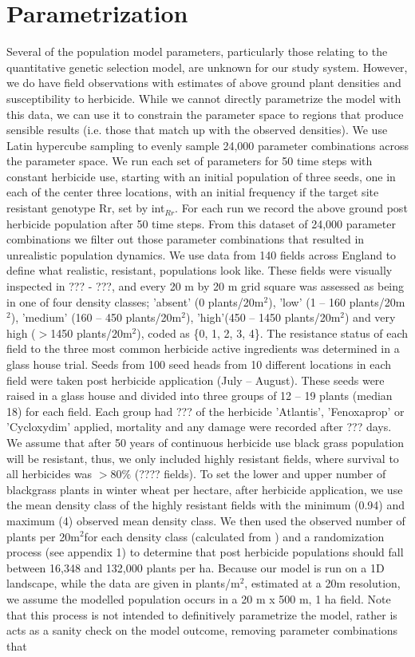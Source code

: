 \documentclass[12pt, a4paper]{article}
\begin{document}
\section{Parametrization}
Several of the population model parameters, particularly those relating to the quantitative genetic selection model, are unknown for our study system. However, we do have field observations with estimates of above ground plant densities and susceptibility to herbicide. While we cannot directly parametrize the model with this data, we can use it to constrain the parameter space to regions that produce sensible results (i.e. those that match up with the observed densities). We use Latin hypercube sampling to evenly sample 24,000 parameter combinations across the parameter space. We run each set of parameters for 50 time steps with constant herbicide use, starting with an initial population of three seeds, one in each of the center three locations, with an initial frequency if the target site resistant genotype Rr, set by int$_{Rr}$. For each run we record the above ground post herbicide population after 50 time steps. From this dataset of 24,000 parameter combinations we filter out those parameter combinations that resulted in unrealistic population dynamics. We use data from 140 fields across England to define what realistic, resistant, populations look like. These fields were visually inspected in ??? - ???, and every 20 m by 20 m grid square was assessed as being in one of four density classes; 'absent' (0 plants/20m$^2$), 'low' (1 -- 160 plants/20m$^2$), 'medium' (160 -- 450 plants/20m$^2$), 'high'(450 -- 1450 plants/20m$^2$) and very high ($>$1450 plants/20m$^2$), coded as \{0, 1, 2, 3, 4\}. The resistance status of each field to the three most common herbicide active ingredients was determined in a glass house trial. Seeds from 100 seed heads from 10 different locations in each field were taken post herbicide application (July -- August). These seeds were raised in a glass house and divided into three groups of 12 -- 19 plants (median 18) for each field. Each group had ??? of the herbicide 'Atlantis', 'Fenoxaprop' or 'Cycloxydim' applied, mortality and any damage were recorded after ??? days. We assume that after 50 years of continuous herbicide use black grass population will be resistant, thus, we only included highly resistant fields, where survival to all herbicides was $>80\%$ (???? fields). To set the lower and upper number of blackgrass plants in winter wheat per hectare, after herbicide application, we use the mean density class of the highly resistant fields with the minimum (0.94) and maximum (4) observed mean density class. We then used the observed number of plants per 20m$^2$for each density class (calculated from \citealt{Quee2011}) and a randomization process (see appendix 1) to determine that post herbicide populations should fall between 16,348 and 132,000 plants per ha. Because our model is run on a 1D landscape, while the data are given in plants/m$^2$, estimated at a 20m resolution, we assume the modelled population occurs in a 20 m x 500 m, 1 ha field. Note that this process is not intended to definitively parametrize the model, rather is acts as a sanity check on the model outcome, removing parameter combinations that 
\end{document}
